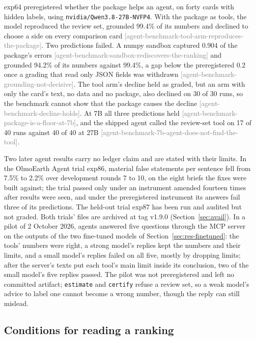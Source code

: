 \documentclass[11pt,a4paper]{article}
\newcommand{\claim}[1]{{\scriptsize\textsf{\textcolor{gray}{[#1]}}}}
\newcommand{\code}[1]{\texttt{#1}}
\begin{document}
exp64 preregistered whether the package helps an agent, on forty cards with hidden labels, using
\code{nvidia/Qwen3.8-27B-NVFP4}. With the package as tools, the model reproduced the review set, grounded 99.4\% of its
numbers and declined to choose a side on every comparison card \claim{agent-benchmark-tool-arm-reproduces-the-package}.
Two predictions failed. A numpy sandbox captured 0.904 of the package's errors
\claim{agent-benchmark-sandbox-rediscovers-the-ranking} and grounded 94.2\% of its numbers against 99.4\%, a gap below the
preregistered 0.2 once a grading that read only JSON fields was withdrawn \claim{agent-benchmark-grounding-not-decisive}.
The tool arm's decline held as graded, but an arm with only the card's text, no data and no package, also declined on
30 of 30 runs, so the benchmark cannot show that the package causes the decline \claim{agent-benchmark-decline-holds}.
At 7B all three predictions held \claim{agent-benchmark-package-is-a-floor-at-7b}, and the shipped agent called the
review-set tool on 17 of 40 runs against 40 of 40 at 27B \claim{agent-benchmark-7b-agent-does-not-find-the-tool}.

Two later agent results carry no ledger claim and are stated with their limits. In the OlmoEarth Agent trial exp86,
material false statements per sentence fell from 7.5\% to 2.2\% over development rounds 7 to 10, on the eight briefs
the fixes were built against; the trial passed only under an instrument amended fourteen times after results were
seen, and under the preregistered instrument its answers fail three of its predictions. The held-out trial exp87 has
been run and audited but not graded. Both trials' files are archived at tag v1.9.0 (Section~\ref{sec:avail}). In a pilot of 2 October 2026, agents answered five questions through the MCP
server on the outputs of the two fine-tuned models of Section~\ref{sec:res-finetuned}: the tools' numbers were right,
a strong model's replies kept the numbers and their limits, and a small model's replies failed on all five, mostly by
dropping limits; after the server's texts put each tool's main limit inside its conclusion, two of the small model's
five replies passed. The pilot was not preregistered and left no committed artifact; \code{estimate} and \code{certify}
refuse a review set, so a weak model's advice to label one cannot become a wrong number, though the reply can still
mislead.

\subsection{Conditions for reading a ranking}
\end{document}
